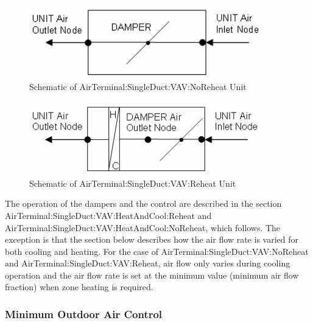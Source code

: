 \begin{figure}[hbtp] %
\centering
\includegraphics[width=0.9\textwidth, height=0.9\textheight, keepaspectratio=true]{media/image2789.png}
\caption{Schematic of AirTerminal:SingleDuct:VAV:NoReheat Unit \protect \label{fig:schematic-of-airterminal-singleduct-vav}}
\end{figure}

\begin{figure}[hbtp] %
\centering
\includegraphics[width=0.9\textwidth, height=0.9\textheight, keepaspectratio=true]{media/image2790.png}
\caption{Schematic of AirTerminal:SingleDuct:VAV:Reheat Unit \protect \label{fig:schematic-of-airterminal-singleduct-vav-001}}
\end{figure}

The operation of the dampers and the control are described in the section AirTerminal:SingleDuct:VAV:HeatAndCool:Reheat and \\ AirTerminal:SingleDuct:VAV:HeatAndCool:NoReheat, which follows. The exception is that the section below describes how the air flow rate is varied for both cooling and heating. For the case of AirTerminal:SingleDuct:VAV:NoReheat and AirTerminal:SingleDuct:VAV:Reheat, air flow only varies during cooling operation and the air flow rate is set at the minimum value (minimum air flow fraction) when zone heating is required.

\subsubsection{Minimum Outdoor Air Control}\label{minimum-outdoor-air-control}

